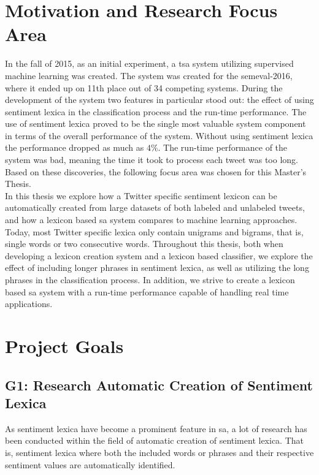\section{Motivation and Research Focus Area}
\label{sec:motivation}
In the fall of 2015, as an initial experiment, a \ac{tsa} system utilizing supervised machine learning was created. The system was created for the \ac{semeval}-2016, where it ended up on 11th place out of 34 competing systems. During the development of the system two features in particular stood out: the effect of using sentiment lexica in the classification process and the run-time performance. The use of sentiment lexica proved to be the single most valuable system component in terms of the overall performance of the system. Without using sentiment lexica the performance dropped as much as $4\%$. The run-time performance of the system was bad, meaning the time it took to process each tweet was too long. Based on these discoveries, the following focus area was chosen for this Master's Thesis. \\      

In this thesis we explore how a Twitter specific sentiment lexicon can be automatically created from large datasets of both labeled and unlabeled tweets, and how a lexicon based \ac{sa} system compares to machine learning approaches. Today, most Twitter specific lexica only contain unigrams and bigrams, that is, single words or two consecutive words. Throughout this thesis, both when developing a lexicon creation system and a lexicon based classifier, we explore the effect of including longer phrases in sentiment lexica, as well as utilizing the long phrases in the classification process. In addition, we strive to create a lexicon based \ac{sa} system with a run-time performance capable of handling real time applications.    

\section{Project Goals}
\label{sec:project_goals}
\subsection*{G1: Research Automatic Creation of Sentiment Lexica}
As sentiment lexica have become a prominent feature in \ac{sa}, a lot of research has been conducted within the field of automatic creation of sentiment lexica. That is, sentiment lexica where both the included words or phrases and their respective sentiment values are automatically identified. \\

